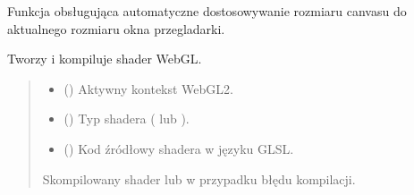 \documentclass[a4paper,10pt,openany,english]{sphinxmanual}
\begin{document}

\begin{fulllineitems}
\label{\detokenize{js/js-functions:resizeCanvas}}
\pysigstartsignatures
\pysiglinewithargsret
{}
{}
{}
\pysigstopsignatures
\sphinxAtStartPar
Funkcja obsługująca automatyczne dostosowywanie rozmiaru canvasu do aktualnego rozmiaru okna przegladarki.

\end{fulllineitems}


\begin{fulllineitems}
\label{\detokenize{js/js-functions:createShader}}
\pysigstartsignatures
\pysiglinewithargsret
{}
{\sphinxparamcomma {}\sphinxparamcomma {}}
{}
\pysigstopsignatures
\sphinxAtStartPar
Tworzy i kompiluje shader WebGL.
\begin{quote}\begin{description}
\begin{itemize}
\item {} 
\sphinxAtStartPar
{} () \textendash{} Aktywny kontekst WebGL2.

\item {} 
\sphinxAtStartPar
{} () \textendash{} Typ shadera ( lub ).

\item {} 
\sphinxAtStartPar
{} () \textendash{} Kod źródłowy shadera w języku GLSL.

\end{itemize}

\sphinxAtStartPar
{} \textendash{} \sphinxhyphen{} Skompilowany shader lub  w przypadku błędu kompilacji.

\end{description}\end{quote}

\end{fulllineitems}
\end{document}
